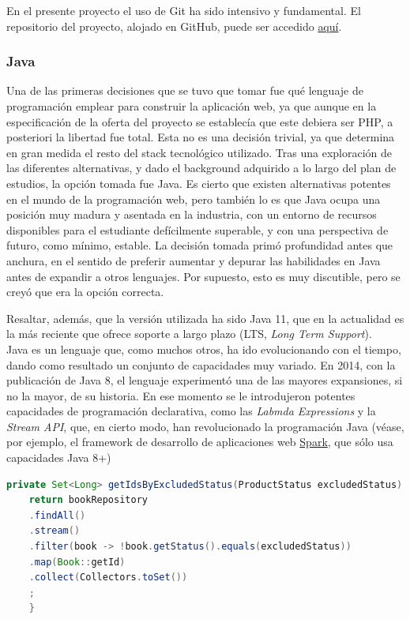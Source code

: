 \documentclass[a4paper]{article}
\begin{document}
    En el presente proyecto el uso de Git ha sido intensivo y fundamental. El repositorio del proyecto, alojado en GitHub, puede ser accedido \href{https://github.com/misrraimsp/firstmarket}{aquí}.
    
    \subsubsection{Java}
    Una de las primeras decisiones que se tuvo que tomar fue qué lenguaje de programación emplear para construir la aplicación web, ya que aunque en la especificación de la oferta del proyecto se establecía que este debiera ser PHP, a posteriori la libertad fue total. Esta no es una decisión trivial, ya que determina en gran medida el resto del stack tecnológico utilizado. Tras una exploración de las diferentes alternativas, y dado el background adquirido a lo largo del plan de estudios, la opción tomada fue Java. Es cierto que existen alternativas potentes en el mundo de la programación web, pero también lo es que Java ocupa una posición muy madura y asentada en la industria, con un entorno de recursos disponibles para el estudiante defícilmente superable, y con una perspectiva de futuro, como mínimo, estable. La decisión tomada primó profundidad antes que anchura, en el sentido de preferir aumentar y depurar las habilidades en Java antes de expandir a otros lenguajes. Por supuesto, esto es muy discutible, pero se creyó que era la opción correcta.
    
    Resaltar, además, que la versión utilizada ha sido Java 11, que en la actualidad es la más reciente que ofrece soporte a largo plazo (LTS, \emph{Long Term Support}).
    \\
    
    Java es un lenguaje que, como muchos otros, ha ido evolucionando con el tiempo, dando como resultado un conjunto de capacidades muy variado. En 2014, con la publicación de Java 8, el lenguaje experimentó una de las mayores expansiones, si no la mayor, de su historia. En ese momento se le introdujeron potentes capacidades de programación declarativa, como las \emph{Labmda Expressions} y la \emph{Stream API}, que, en cierto modo, han revolucionado la programación Java (véase, por ejemplo, el framework de desarrollo de aplicaciones web \href{http://sparkjava.com/}{Spark}, que sólo usa capacidades Java 8+)
    \\
    
    \begin{lstlisting}[language=Java,caption=Programación declarativa con Java,label=list:java_declarative]
    private Set<Long> getIdsByExcludedStatus(ProductStatus excludedStatus) {
    return bookRepository
    .findAll()
    .stream()
    .filter(book -> !book.getStatus().equals(excludedStatus))
    .map(Book::getId)
    .collect(Collectors.toSet())
    ;
    }
    \end{lstlisting}
    
\end{document}
